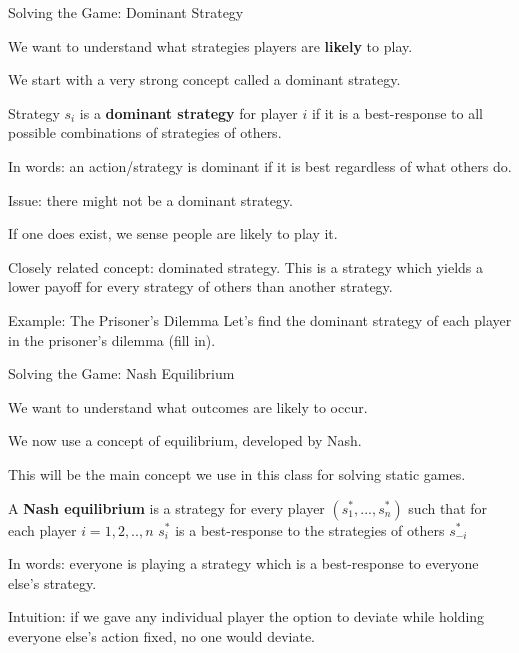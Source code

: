\documentclass[aspectratio=169]{beamer}
\newenvironment{wideitemize}{\itemize\addtolength{\itemsep}{10pt}}{\enditemize}
\begin{document}
\begin{frame}{Solving the Game: Dominant Strategy}
\begin{wideitemize}
    \item We want to understand what strategies players are \textbf{likely} to play.
    \item We start with a very strong concept called a dominant strategy.
    \begin{definition}
Strategy $s_i$ is a \textbf{dominant strategy} for player $i$ if it is a best-response to all possible combinations of strategies of others.

\end{definition}
\item In words: an action/strategy is dominant if it is best regardless of what others do.
\item Issue: there might not be a dominant strategy.
\item If one does exist, we sense people are likely to play it.
\item Closely related concept: dominated strategy. This is a strategy which yields a lower payoff for every strategy of others than another strategy.
\end{wideitemize}


\end{frame}

\begin{frame}{Example: The Prisoner's Dilemma}
Let's find the dominant strategy of each player in the prisoner's dilemma (fill in). 

\vspace{6cm}


\end{frame}

\begin{frame}{Solving the Game: Nash Equilibrium}
\begin{wideitemize}
    \item We want to understand what outcomes are likely to occur.
    \item We now use a concept of equilibrium, developed by Nash.
    \item This will be the main concept we use in this class for solving static games.
    \begin{definition}
A \textbf{Nash equilibrium} is a strategy for every player $(s_1^*,...,s_n^*)$ such that for each player $i=1,2,..,n$ $s_i^*$ is a best-response to the strategies of others $s_{-i}^*$

\end{definition}
\item In words: everyone is playing a strategy which is a best-response to everyone else's strategy.
\item Intuition: if we gave any individual player the option to deviate while holding everyone else's action fixed, no one would deviate.
\end{wideitemize}


\end{frame}
\end{document}
